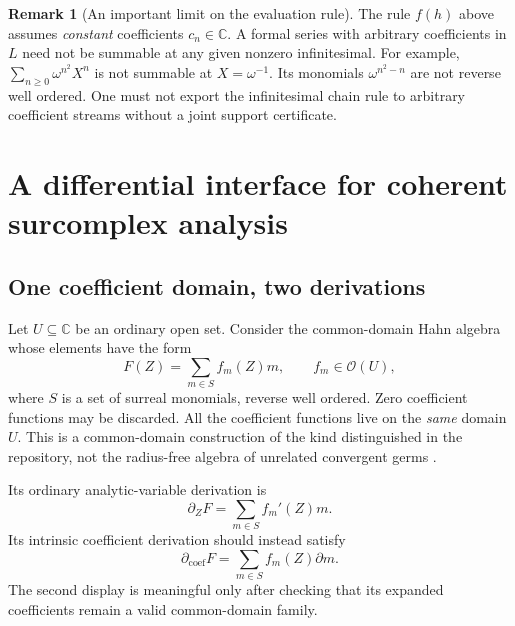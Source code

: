 \documentclass[11pt]{article}
\numberwithin{equation}{section}
\theoremstyle{definition}
\newtheorem{remark}[theorem]{Remark}
\newcommand{\C}{\mathbb C}
\newcommand{\DD}{\partial}
\newcommand{\Dc}{\partial_{\mathrm{coef}}}
\newcommand{\Dz}{\partial_Z}
\begin{document}
\begin{remark}[An important limit on the evaluation rule]
The rule $f(h)$ above assumes \emph{constant} coefficients
$c_n\in\C$. A formal series with arbitrary coefficients in $L$ need not
be summable at any given nonzero infinitesimal. For example,
$\sum_{n\ge0}\omega^{n^2}X^n$ is not summable at $X=\omega^{-1}$.
Its monomials $\omega^{n^2-n}$ are not reverse well ordered. One must
not export the infinitesimal chain rule to arbitrary coefficient streams
without a joint support certificate.
\end{remark}

\section{A differential interface for coherent surcomplex analysis}
\label{sec:coherent}

\subsection{One coefficient domain, two derivations}
Let $U\subseteq\C$ be an ordinary open set. Consider the common-domain
Hahn algebra whose elements have the form
\begin{equation}\label{eq:coherentF}
 F(Z)=\sum_{m\in S}f_m(Z)m,
 \qquad f_m\in\mathcal O(U),
\end{equation}
where $S$ is a set of surreal monomials, reverse well ordered. Zero
coefficient functions may be discarded. All the coefficient functions live
on the \emph{same} domain $U$. This is a common-domain construction of the
kind distinguished in the repository, not the radius-free algebra of
unrelated convergent germs \cite{RepoAnalysis}.

Its ordinary analytic-variable derivation is
\[
 \Dz F=\sum_{m\in S}f_m'(Z)m.
\]
Its intrinsic coefficient derivation should instead satisfy
\[
 \Dc F=\sum_{m\in S}f_m(Z)\DD m.
\]
The second display is meaningful only after checking that its expanded
coefficients remain a valid common-domain family.
\end{document}
